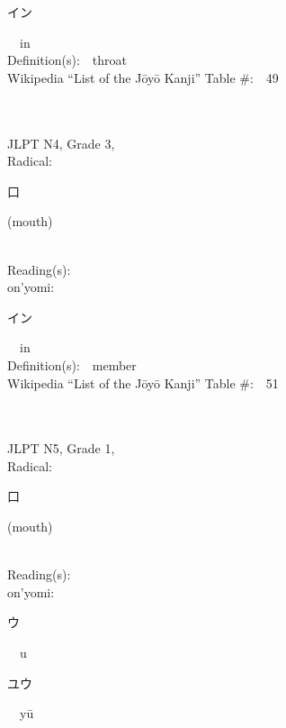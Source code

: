 \begin{multicols}{2}
{\hspace*{2em}}{\begin{CJK}{UTF8}{min} イン \end{CJK}}\ \ in\ \ \\
Definition(s):\ \ throat \\
Wikipedia ``List of the J\=oy\=o Kanji'' Table \#:\ \ 49 \\
\ \ \\
{\fontsize{34pt}{40pt}  }\ \ \\  %
{JLPT N4, Grade 3, \\Radical:\ \ {\begin{CJK}{UTF8}{min} 口 \end{CJK}} (mouth) } \\
Reading(s):\ \ \\
{\hspace*{1em}}on'yomi:\ \ \\
{\hspace*{2em}}{\begin{CJK}{UTF8}{min} イン \end{CJK}}\ \ in\ \ \\
Definition(s):\ \ member \\
Wikipedia ``List of the J\=oy\=o Kanji'' Table \#:\ \ 51 \\
\ \ \\
{\fontsize{34pt}{40pt}  }\ \ \\  %
{JLPT N5, Grade 1, \\Radical:\ \ {\begin{CJK}{UTF8}{min} 口 \end{CJK}} (mouth) } \\
Reading(s):\ \ \\
{\hspace*{1em}}on'yomi:\ \ \\
{\hspace*{2em}}{\begin{CJK}{UTF8}{min} ウ \end{CJK}}\ \ u\ \ \\
{\hspace*{2em}}{\begin{CJK}{UTF8}{min} ユウ \end{CJK}}\ \ y\=u\ \ \\

\end{multicols}
